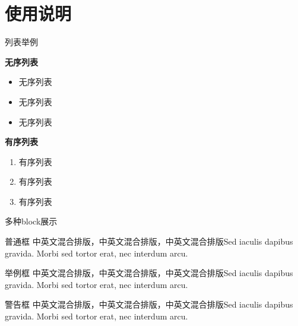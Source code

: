 \documentclass{beamer}
\begin{document}
\section{使用说明}

\begin{frame}{列表举例}
	\begin{block}{\textbf{无序列表}}
		\begin{itemize}
			\item 无序列表
			\item 无序列表
			\item 无序列表
		\end{itemize}
	\end{block}
	
	\begin{block}{\textbf{有序列表}}
		\begin{enumerate}
			\item 有序列表
			\item 有序列表
			\item 有序列表
		\end{enumerate}
	\end{block}
\end{frame}

\begin{frame}{多种block展示}
	\begin{block}{普通框}
		中英文混合排版，中英文混合排版，中英文混合排版Sed iaculis
		dapibus gravida. Morbi sed tortor erat, nec interdum arcu. 
	\end{block}
	\begin{exampleblock}{举例框}
		中英文混合排版，中英文混合排版，中英文混合排版Sed iaculis
		dapibus gravida. Morbi sed tortor erat, nec interdum arcu.
	\end{exampleblock}
	\begin{alertblock}{警告框}
		中英文混合排版，中英文混合排版，中英文混合排版Sed iaculis
		dapibus gravida. Morbi sed tortor erat, nec interdum arcu.
	\end{alertblock}
\end{frame}
\end{document}

